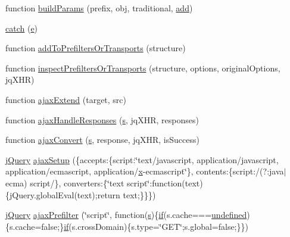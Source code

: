 \begin{DoxyCompactItemize}
\item 
function \hyperlink{jquery-1_8x_8js_a3c4f3b337daa2444fa73ee856be5f9d8}{build\+Params} (prefix, obj, traditional, \hyperlink{jquery_8js_a638fd10c6d2f5e258459b1abfa3b94ea}{add})
\item 
\hyperlink{jquery-1_8x_8js_a5bf45fc51bc0426586792b5f9cb95431}{catch} (\hyperlink{jqplot_8barRenderer_8min_8js_a2ce90ea5f2a400a3a152319491a737ff}{e})
\item 
function \hyperlink{jquery-1_8x_8js_ae8bffbac8c6b2208e0ca37b475ec0b70}{add\+To\+Prefilters\+Or\+Transports} (structure)
\item 
function \hyperlink{jquery-1_8x_8js_ac96b244aea80657fe2d6e3d2c1e8b622}{inspect\+Prefilters\+Or\+Transports} (structure, options, original\+Options, jq\+X\+HR)
\item 
function \hyperlink{jquery-1_8x_8js_a113ade43cfd5328ebd5ccc84f45fe4de}{ajax\+Extend} (target, src)
\item 
function \hyperlink{jquery-1_8x_8js_a71c2db7846f21963cee426cb81003c63}{ajax\+Handle\+Responses} (\hyperlink{respond_8min_8js_ad9a7d92cb87932d25187fdec3ba1b621}{s}, jq\+X\+HR, responses)
\item 
function \hyperlink{jquery-1_8x_8js_a549518271b8708165811ae69c274b58a}{ajax\+Convert} (\hyperlink{respond_8min_8js_ad9a7d92cb87932d25187fdec3ba1b621}{s}, response, jq\+X\+HR, is\+Success)
\item 
\hyperlink{xe__solid__enterprise__login_2js_2login_8js_a5d40f04b6bb824963a42ec4b5fbfe262}{j\+Query} \hyperlink{jquery-1_8x_8js_a52a40924d02e0d9756f051e36a640cd6}{ajax\+Setup} (\{accepts\+:\{script\+:\char`\"{}text/javascript, application/javascript, application/ecmascript, application/\hyperlink{jquery-1_8x_8min_8js_a5ce50d751c9664d05375c8f5080ed43e}{x}-\/ecmascript\char`\"{}\}, contents\+:\{script\+:/(?\+:java$\vert$ecma) script/\}, converters\+:\{\char`\"{}text script\char`\"{}\+:function(text)\{j\+Query.\+global\+Eval(text);return text;\}\}\})
\item 
\hyperlink{xe__solid__enterprise__login_2js_2login_8js_a5d40f04b6bb824963a42ec4b5fbfe262}{j\+Query} \hyperlink{jquery-1_8x_8js_a144939e373cc1ad511a53c4251ec7ffa}{ajax\+Prefilter} (\char`\"{}script\char`\"{}, function(\hyperlink{respond_8min_8js_ad9a7d92cb87932d25187fdec3ba1b621}{s})\{\hyperlink{menu_2tpl_2js_2jquery_8jstree_8js_acba95bef569cfaee32c4ed0212b2bb92}{if}(s.\+cache===\hyperlink{menu_2tpl_2js_2jquery_8tmpl_8js_a08113a236cc18d2a9d5ce27e638012be}{undefined})\{s.\+cache=false;\}\hyperlink{menu_2tpl_2js_2jquery_8jstree_8js_acba95bef569cfaee32c4ed0212b2bb92}{if}(s.\+cross\+Domain)\{s.\+type=\char`\"{}G\+ET\char`\"{};s.\+global=false;\}\})

\end{DoxyCompactItemize}
